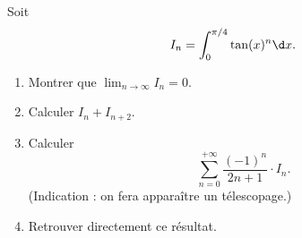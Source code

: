 \begin{enonce}
\begin{exercise}[ID={RMS135 E1477},subtitle={IMT MP 2024},tags={},difficulty={}]

Soit 
\begin{equation*}
I_n = \int_0^{\pi/4} \tan(x)^n \d x.
\end{equation*}

\begin{enumerate}
  \item Montrer que $\displaystyle \lim_{n \to \infty} I_n = 0$.
  \item Calculer $I_n + I_{n+2}$.
  \item Calculer 
  \begin{equation*}
  \sum_{n=0}^{+\infty} \frac{(-1)^n}{2n + 1} \cdot I_n.
  \end{equation*}
  (Indication : on fera apparaître un télescopage.)
  \item Retrouver directement ce résultat.
\end{enumerate}

\end{exercise}
\begin{solution}
\end{solution}
\end{enonce}
